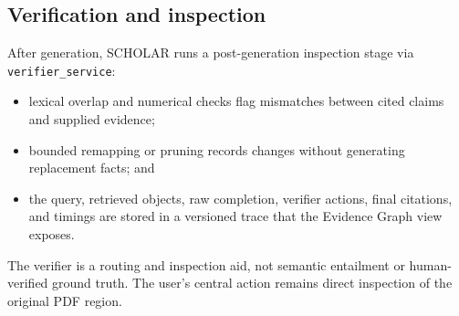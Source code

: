 \subsection{Verification and inspection}
After generation, \textsc{SCHOLAR} runs a post-generation inspection stage via \texttt{verifier\_service}:
\begin{itemize}[leftmargin=*,itemsep=1pt,topsep=2pt]
    \item lexical overlap and numerical checks flag mismatches between cited claims and supplied evidence;
    \item bounded remapping or pruning records changes without generating replacement facts; and
    \item the query, retrieved objects, raw completion, verifier actions, final citations, and timings are stored in a versioned trace that the Evidence Graph view exposes.
\end{itemize}
The verifier is a routing and inspection aid, not semantic entailment or human-verified ground truth. The user's central action remains direct inspection of the original PDF region.
